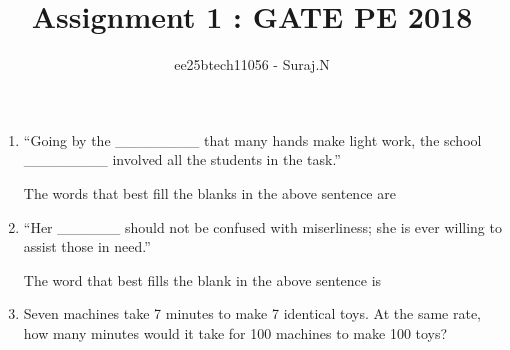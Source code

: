 \documentclass[journal,12pt,onecolumn]{IEEEtran}
\theoremstyle{remark}
\begin{document}
\title{Assignment 1 : GATE PE 2018}
\author{ee25btech11056 - Suraj.N}
\maketitle
\renewcommand{\thefigure}{\theenumi}
\renewcommand{\thetable}{\theenumi}

\begin{enumerate}
 
\item``Going by the \_\_\_\_\_\_\_\_ that many hands make light work, the school \_\_\_\_\_\_\_\_ involved all the students in the task.''

\hfill{} 

The words that best fill the blanks in the above sentence are 

\begin{enumerate}
\end{enumerate}

\item ``Her \_\_\_\_\_\_ should not be confused with miserliness; she is ever willing to assist those in need.'' 

\hfill{} 

The word that best fills the blank in the above sentence is 

\begin{enumerate}
\end{enumerate}

\item Seven machines take 7 minutes to make 7 identical toys. At the same rate, how many minutes would it take for 100 machines to make 100 toys? 

\hfill{}

\begin{enumerate}
\end{enumerate}


\end{enumerate}
\end{document}
